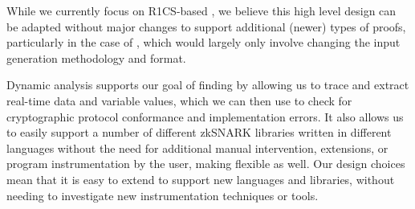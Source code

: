 
While we currently focus on R1CS-based \zksnark, we believe this high level design can be adapted without major changes to support additional (newer) types of proofs, particularly in the case of \SnarkFuzzer, which would largely only involve changing the input generation methodology and format.

Dynamic analysis supports our goal of finding  by allowing us to trace and extract real-time data and variable values, which we can then use to check for cryptographic protocol conformance and implementation errors.
It also allows us to easily support a number of different zkSNARK libraries written in different languages without the need for additional manual intervention, extensions, or program instrumentation by the user, making \snarkprobe flexible as well.
Our design choices mean that it is easy to extend \snarkprobe to support new languages and libraries, without needing to investigate new instrumentation techniques or tools.



